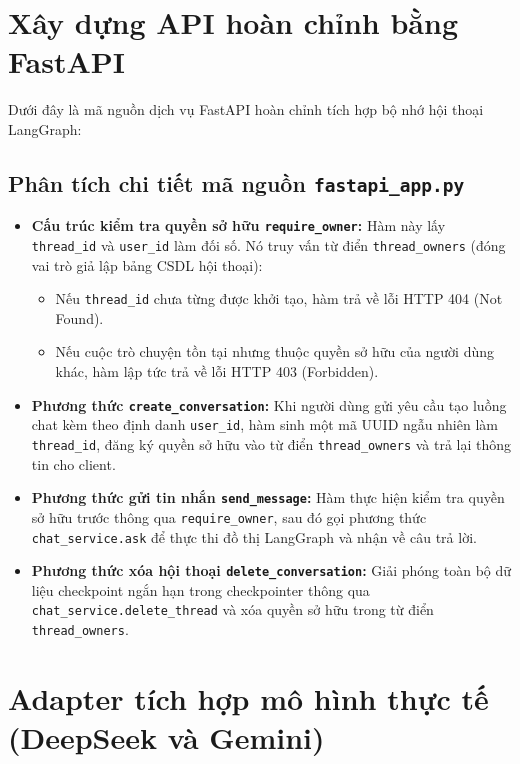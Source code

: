 \section{Xây dựng API hoàn chỉnh bằng FastAPI}

Dưới đây là mã nguồn dịch vụ FastAPI hoàn chỉnh tích hợp bộ nhớ hội thoại LangGraph:

\begingroup

\endgroup

\subsection{Phân tích chi tiết mã nguồn \texttt{fastapi\_app.py}}
\begin{itemize}
  \item \textbf{Cấu trúc kiểm tra quyền sở hữu \texttt{require\_owner}:} Hàm này lấy \texttt{thread\_id} và \texttt{user\_id} làm đối số. Nó truy vấn từ điển \texttt{thread\_owners} (đóng vai trò giả lập bảng CSDL hội thoại):
  \begin{itemize}
    \item Nếu \texttt{thread\_id} chưa từng được khởi tạo, hàm trả về lỗi HTTP 404 (Not Found).
    \item Nếu cuộc trò chuyện tồn tại nhưng thuộc quyền sở hữu của người dùng khác, hàm lập tức trả về lỗi HTTP 403 (Forbidden).
  \end{itemize}
  \item \textbf{Phương thức \texttt{create\_conversation}:} Khi người dùng gửi yêu cầu tạo luồng chat kèm theo định danh \texttt{user\_id}, hàm sinh một mã UUID ngẫu nhiên làm \texttt{thread\_id}, đăng ký quyền sở hữu vào từ điển \texttt{thread\_owners} và trả lại thông tin cho client.
  \item \textbf{Phương thức gửi tin nhắn \texttt{send\_message}:} Hàm thực hiện kiểm tra quyền sở hữu trước thông qua \texttt{require\_owner}, sau đó gọi phương thức \texttt{chat\_service.ask} để thực thi đồ thị LangGraph và nhận về câu trả lời.
  \item \textbf{Phương thức xóa hội thoại \texttt{delete\_conversation}:} Giải phóng toàn bộ dữ liệu checkpoint ngắn hạn trong checkpointer thông qua \texttt{chat\_service.delete\_thread} và xóa quyền sở hữu trong từ điển \texttt{thread\_owners}.
\end{itemize}

\section{Adapter tích hợp mô hình thực tế (DeepSeek và Gemini)}

